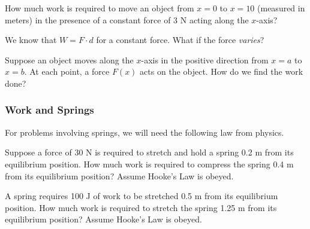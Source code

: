 \documentclass[12pt]{article}
\begin{document}
\Example How much work is required to move an object from $x=0$ to $x=10$ (measured in meters) in the presence of a constant force of 3 N acting along the $x$-axis?

\vspace{40mm}

We know that $W=F\cdot d$ for a constant force. What if the force \textit{varies}?

\vspace{3mm}

Suppose an object moves along the $x$-axis in the positive direction from $x=a$ to $x=b$. At each point, a force $F(x)$ acts on the object. How do we find the work done?

\vfill


\newpage

\subsubsection*{Work and Springs}

For problems involving springs, we will need the following law from physics.\\


\vspace{25mm}

\Example Suppose a force of 30 N is required to stretch and hold a spring 0.2 m from its equilibrium position. How much work is required to compress the spring 0.4 m from its equilibrium position? Assume Hooke's Law is obeyed.

\newpage

\Example A spring requires 100 J of work to be stretched 0.5 m from its equilibrium position. How much work is required to stretch the spring 1.25 m from its equilibrium position? Assume Hooke's Law is obeyed.
\end{document}
